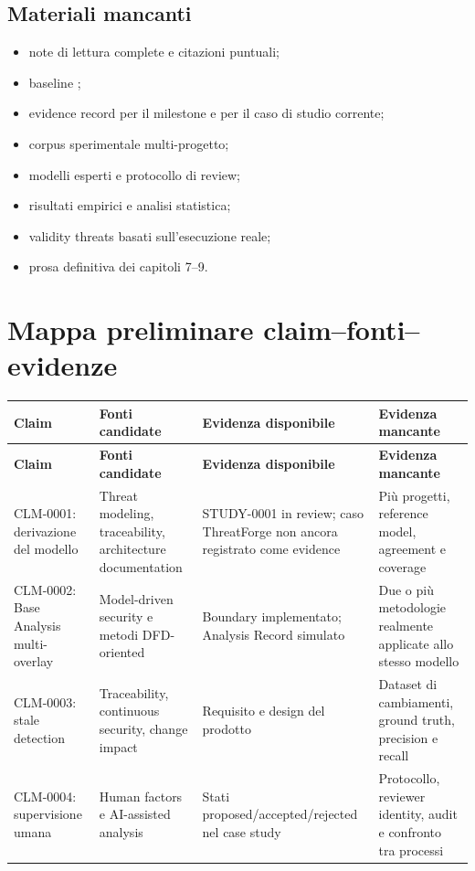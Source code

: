 \documentclass[12pt,a4paper,oneside]{report}
\newcommand{\artifact}[1]{{\ttfamily\seqsplit{#1}}}
\begin{document}
\section{Materiali mancanti}

\begin{itemize}
  \item note di lettura complete e citazioni puntuali;
  \item baseline \artifact{TF-BL-0002};
  \item evidence record per il milestone e per il caso di studio corrente;
  \item corpus sperimentale multi-progetto;
  \item modelli esperti e protocollo di review;
  \item risultati empirici e analisi statistica;
  \item validity threats basati sull'esecuzione reale;
  \item prosa definitiva dei capitoli 7--9.
\end{itemize}

\chapter{Mappa preliminare claim--fonti--evidenze}

\begin{longtable}{p{} p{} p{} p{}}
\toprule
\textbf{Claim} & \textbf{Fonti candidate} & \textbf{Evidenza disponibile} & \textbf{Evidenza mancante} \\
\midrule
\endfirsthead
\toprule
\textbf{Claim} & \textbf{Fonti candidate} & \textbf{Evidenza disponibile} & \textbf{Evidenza mancante} \\
\midrule
\endhead
CLM-0001: derivazione del modello & Threat modeling, traceability, architecture documentation & STUDY-0001 in review; caso ThreatForge non ancora registrato come evidence & Più progetti, reference model, agreement e coverage \\
\addlinespace
CLM-0002: Base Analysis multi-overlay & Model-driven security e metodi DFD-oriented & Boundary implementato; Analysis Record simulato & Due o più metodologie realmente applicate allo stesso modello \\
\addlinespace
CLM-0003: stale detection & Traceability, continuous security, change impact & Requisito e design del prodotto & Dataset di cambiamenti, ground truth, precision e recall \\
\addlinespace
CLM-0004: supervisione umana & Human factors e AI-assisted analysis & Stati proposed/accepted/rejected nel case study & Protocollo, reviewer identity, audit e confronto tra processi \\
\bottomrule
\end{longtable}
\end{document}
